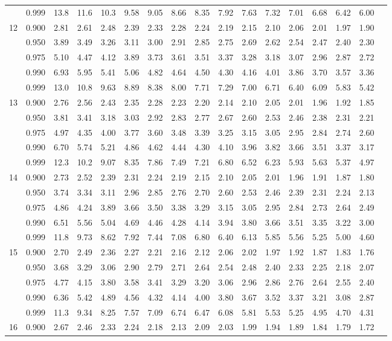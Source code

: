{\begin{center}
\begin{tabular}{rrr@{\,}r@{\,}r@{\,}r@{\,}r@{\,}r@{\,}r@{\,}r
                   @{\,}r@{\,}r@{\,}r@{\,}r@{\,}r@{\,}r@{\,}r}
  &0.999&13.8&11.6&10.3&9.58&9.05&8.66&8.35&7.92&7.63&7.32&7.01&6.68&6.42&6.00\\
12&0.900&2.81&2.61&2.48&2.39&2.33&2.28&2.24&2.19&2.15&2.10&2.06&2.01&1.97&1.90\\
  &0.950&3.89&3.49&3.26&3.11&3.00&2.91&2.85&2.75&2.69&2.62&2.54&2.47&2.40&2.30\\
  &0.975&5.10&4.47&4.12&3.89&3.73&3.61&3.51&3.37&3.28&3.18&3.07&2.96&2.87&2.72\\
  &0.990&6.93&5.95&5.41&5.06&4.82&4.64&4.50&4.30&4.16&4.01&3.86&3.70&3.57&3.36\\
  &0.999&13.0&10.8&9.63&8.89&8.38&8.00&7.71&7.29&7.00&6.71&6.40&6.09&5.83&5.42\\
13&0.900&2.76&2.56&2.43&2.35&2.28&2.23&2.20&2.14&2.10&2.05&2.01&1.96&1.92&1.85\\
  &0.950&3.81&3.41&3.18&3.03&2.92&2.83&2.77&2.67&2.60&2.53&2.46&2.38&2.31&2.21\\
  &0.975&4.97&4.35&4.00&3.77&3.60&3.48&3.39&3.25&3.15&3.05&2.95&2.84&2.74&2.60\\
  &0.990&6.70&5.74&5.21&4.86&4.62&4.44&4.30&4.10&3.96&3.82&3.66&3.51&3.37&3.17\\
  &0.999&12.3&10.2&9.07&8.35&7.86&7.49&7.21&6.80&6.52&6.23&5.93&5.63&5.37&4.97\\
14&0.900&2.73&2.52&2.39&2.31&2.24&2.19&2.15&2.10&2.05&2.01&1.96&1.91&1.87&1.80\\
  &0.950&3.74&3.34&3.11&2.96&2.85&2.76&2.70&2.60&2.53&2.46&2.39&2.31&2.24&2.13\\
  &0.975&4.86&4.24&3.89&3.66&3.50&3.38&3.29&3.15&3.05&2.95&2.84&2.73&2.64&2.49\\
  &0.990&6.51&5.56&5.04&4.69&4.46&4.28&4.14&3.94&3.80&3.66&3.51&3.35&3.22&3.00\\
  &0.999&11.8&9.73&8.62&7.92&7.44&7.08&6.80&6.40&6.13&5.85&5.56&5.25&5.00&4.60\\
15&0.900&2.70&2.49&2.36&2.27&2.21&2.16&2.12&2.06&2.02&1.97&1.92&1.87&1.83&1.76\\
  &0.950&3.68&3.29&3.06&2.90&2.79&2.71&2.64&2.54&2.48&2.40&2.33&2.25&2.18&2.07\\
  &0.975&4.77&4.15&3.80&3.58&3.41&3.29&3.20&3.06&2.96&2.86&2.76&2.64&2.55&2.40\\
  &0.990&6.36&5.42&4.89&4.56&4.32&4.14&4.00&3.80&3.67&3.52&3.37&3.21&3.08&2.87\\
  &0.999&11.3&9.34&8.25&7.57&7.09&6.74&6.47&6.08&5.81&5.53&5.25&4.95&4.70&4.31\\
16&0.900&2.67&2.46&2.33&2.24&2.18&2.13&2.09&2.03&1.99&1.94&1.89&1.84&1.79&1.72\\

\end{tabular}
\end{center}}
